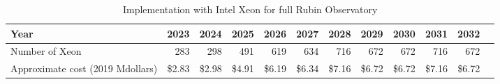 \tiny \begin{longtable} { |p{}  |r  |r  |r  |r  |r  |r  |r  |r  |r  |r  |r |} 
\caption{Implementation with Intel Xeon for full Rubin Observatory \label{tab:opsXeon}}\\ 
\hline 
\textbf{Year}&\textbf{2023}&\textbf{2024}&\textbf{2025}&\textbf{2026}&\textbf{2027}&\textbf{2028}&\textbf{2029}&\textbf{2030}&\textbf{2031}&\textbf{2032} \\ \hline
{Number of Xeon}&{283}&{298}&{491}&{619}&{634}&{716}&{672}&{672}&{716}&{672} \\ \hline
{Approximate cost (2019 Mdollars)}&{\$2.83}&{\$2.98}&{\$4.91}&{\$6.19}&{\$6.34}&{\$7.16}&{\$6.72}&{\$6.72}&{\$7.16}&{\$6.72} \\ \hline
\end{longtable} \normalsize
